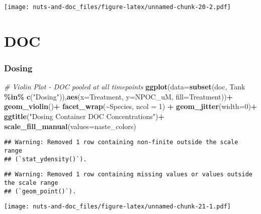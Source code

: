 \documentclass[
]{article}
\newenvironment{Shaded}{\begin{snugshade}}{\end{snugshade}}
\newcommand{\AttributeTok}[1]{\textcolor[rgb]{0.13,0.29,0.53}{#1}}
\newcommand{\CommentTok}[1]{\textcolor[rgb]{0.56,0.35,0.01}{\textit{#1}}}
\newcommand{\DecValTok}[1]{\textcolor[rgb]{0.00,0.00,0.81}{#1}}
\newcommand{\FunctionTok}[1]{\textcolor[rgb]{0.13,0.29,0.53}{\textbf{#1}}}
\newcommand{\NormalTok}[1]{#1}
\newcommand{\SpecialCharTok}[1]{\textcolor[rgb]{0.81,0.36,0.00}{\textbf{#1}}}
\newcommand{\StringTok}[1]{\textcolor[rgb]{0.31,0.60,0.02}{#1}}
\begin{document}
\texttt{[image: nuts-and-doc\_files/figure-latex/unnamed-chunk-20-2.pdf]}

\hypertarget{doc}{%
\section{DOC}\label{doc}}

\hypertarget{dosing-8}{%
\subsubsection{Dosing}\label{dosing-8}}

\begin{Shaded}
\begin{Highlighting}[]
\CommentTok{\# Violin Plot {-} DOC pooled at all timepoints}
\FunctionTok{ggplot}\NormalTok{(}\AttributeTok{data=}\FunctionTok{subset}\NormalTok{(doc, Tank }\SpecialCharTok{\%in\%} \FunctionTok{c}\NormalTok{(}\StringTok{"Dosing"}\NormalTok{)),}\FunctionTok{aes}\NormalTok{(}\AttributeTok{x=}\NormalTok{Treatment, }\AttributeTok{y=}\NormalTok{NPOC\_uM, }\AttributeTok{fill=}\NormalTok{Treatment))}\SpecialCharTok{+}
  \FunctionTok{geom\_violin}\NormalTok{()}\SpecialCharTok{+}
  \FunctionTok{facet\_wrap}\NormalTok{(}\SpecialCharTok{\textasciitilde{}}\NormalTok{Species, }\AttributeTok{ncol =} \DecValTok{1}\NormalTok{) }\SpecialCharTok{+}
  \FunctionTok{geom\_jitter}\NormalTok{(}\AttributeTok{width=}\DecValTok{0}\NormalTok{)}\SpecialCharTok{+}
  \FunctionTok{ggtitle}\NormalTok{(}\StringTok{"Dosing Container DOC Concentrations"}\NormalTok{)}\SpecialCharTok{+}
  \FunctionTok{scale\_fill\_manual}\NormalTok{(}\AttributeTok{values=}\NormalTok{naste\_colors)}
\end{Highlighting}
\end{Shaded}

\begin{verbatim}
## Warning: Removed 1 row containing non-finite outside the scale range
## (`stat_ydensity()`).
\end{verbatim}

\begin{verbatim}
## Warning: Removed 1 row containing missing values or values outside the scale range
## (`geom_point()`).
\end{verbatim}

\texttt{[image: nuts-and-doc\_files/figure-latex/unnamed-chunk-21-1.pdf]}
\end{document}
